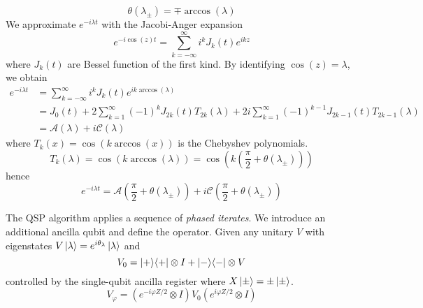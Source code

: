 \documentclass[11pt, oneside]{article}   	%
\begin{document}
\begin{equation*} 
\theta (\lambda_{\pm}) = \mp \arccos(\lambda)
\end{equation*}
We approximate $e^{-i \lambda t}$ with the Jacobi-Anger expansion
\begin{equation*} 
e^{-i \cos(z) t} = \sum^{\infty}_{k=-\infty} i^k J_k(t) e^{i k z}
\end{equation*}
where $J_k(t)$ are Bessel function of the first kind.
By identifying $\cos(z) = \lambda$, we obtain
\begin{align*} 
e^{-i \lambda t} 
&= \sum^{\infty}_{k=-\infty} i^k J_k(t) e^{i k \arccos(\lambda)} \\
&= J_0(t) + 2 \sum^{\infty}_{k=1} (-1)^{k} J_{2k}(t) T_{2k}(\lambda) + 2i \sum^{\infty}_{k=1} (-1)^{k-1} J_{2k-1}(t) T_{2k-1}(\lambda) \\
&= \mathcal{A}(\lambda) + i \mathcal{C}(\lambda)
\end{align*}
where $T_k (x) = \cos(k \arccos(x))$ is the Chebyshev polynomials.
\begin{equation*} 
T_k (\lambda) = \cos(k \arccos(\lambda)) = \cos \left( k \left( \frac{\pi}{2} + \theta(\lambda_{\pm}) \right) \right)
\end{equation*}
hence 
\begin{equation*}
e^{-i \lambda t} = \mathcal{A} \left( \frac{\pi}{2} + \theta(\lambda_{\pm}) \right) + i \mathcal{C} \left( \frac{\pi}{2} + \theta(\lambda_{\pm}) \right)
\end{equation*}

The QSP algorithm applies a sequence of \textit{phased iterates}. 
We introduce an additional ancilla qubit and define the operator.
Given any unitary $V$ with eigenstates $V \ket{\lambda} = e^{i \theta_{\lambda}} \ket{\lambda}$ and 
\begin{equation*} 
V_0 = \ket{+} \! \bra{+} \otimes I +  \ket{-} \! \bra{-} \otimes V
\end{equation*}
controlled by the single-qubit ancilla register where $X \ket{\pm} = \pm \ket{\pm}$.
\begin{equation*} 
V_{\varphi} = (e^{-i \varphi Z/2} \otimes I) V_0 (e^{i \varphi Z/2} \otimes I) 
\end{equation*}

\end{document}
